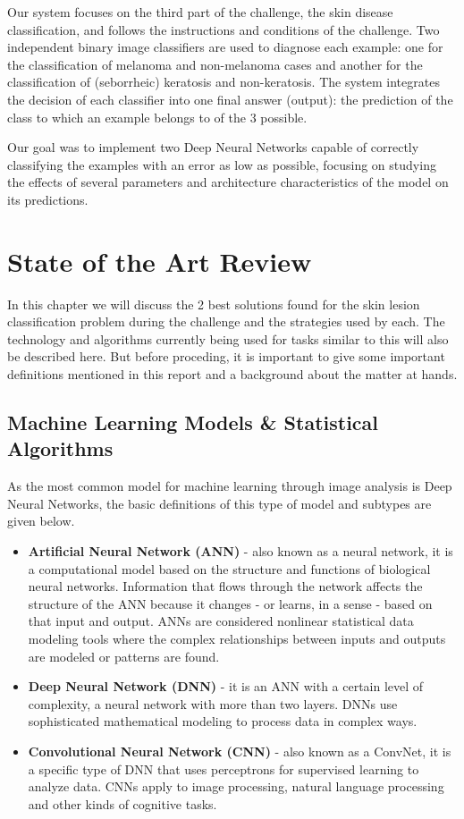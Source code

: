 \documentclass[10pt]{IEEEtran}
\begin{document}
Our system focuses on the third part of the challenge, the skin disease classification, and follows the instructions and conditions of the challenge. 
Two independent binary image classifiers are used to diagnose each example: one for the classification of melanoma and non-melanoma cases and another for the classification of (seborrheic) keratosis and non-keratosis. 
The system integrates the decision of each classifier into one final answer (output): the prediction of the class to which an example belongs to of the 3 possible.

Our goal was to implement two Deep Neural Networks capable of correctly classifying the examples with an error as low as possible, focusing on studying the effects of several parameters and architecture characteristics of the model on its predictions.

\newpage{}
\section{\textbf{State of the Art Review}} %

In this chapter we will discuss the 2 best solutions found for the skin lesion classification problem during the challenge and the strategies used by each. 
The technology and algorithms currently being used for tasks similar to this will also be described here.
But before proceding, it is important to give some important definitions mentioned in this report and a background about the matter at hands.

\subsection{Machine Learning Models \& Statistical Algorithms}

As the most common model for machine learning through image analysis is Deep Neural Networks, the basic definitions of this type of model and subtypes are given below.

\begin{itemize}
\item \textbf{Artificial Neural Network (ANN)} - also known as a neural network, it is a computational model based on the structure and functions of biological neural networks. Information that flows through the network affects the structure of the ANN because it changes - or learns, in a sense - based on that input and output. ANNs are considered nonlinear statistical data modeling tools where the complex relationships between inputs and outputs are modeled or patterns are found.
\item \textbf{Deep Neural Network (DNN)} - it is an ANN with a certain level of complexity, a neural network with more than two layers. DNNs use sophisticated mathematical modeling to process data in complex ways.
\item \textbf{Convolutional Neural Network (CNN)} -  also known as a ConvNet, it is a specific type of DNN that uses perceptrons for supervised learning to analyze data. CNNs apply to image processing, natural language processing and other kinds of cognitive tasks.
\end{itemize}
\end{document}
